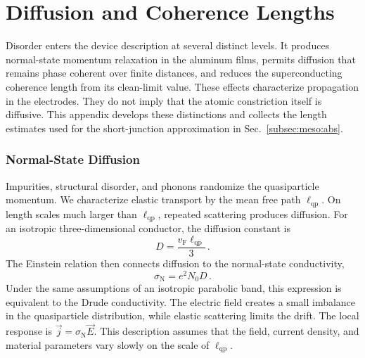 
\chapter{Diffusion and Coherence Lengths}
\label{app:theory:diffusive-transport}

    Disorder enters the device description at several distinct levels. It produces normal-state momentum relaxation in the aluminum films, permits diffusion that remains phase coherent over finite distances, and reduces the superconducting coherence length from its clean-limit value. These effects characterize propagation in the electrodes. They do not imply that the atomic constriction itself is diffusive. This appendix develops these distinctions and collects the length estimates used for the short-junction approximation in Sec.~\ref{subsec:meso:abs}.

    \subsection*{Normal-State Diffusion}

        Impurities, structural disorder, and phonons randomize the quasiparticle momentum. We characterize elastic transport by the mean free path $\ell_\mathrm{qp}$. On length scales much larger than $\ell_\mathrm{qp}$, repeated scattering produces diffusion. For an isotropic three-dimensional conductor, the diffusion constant is
        \begin{equation}
            D = \frac{v_\mathrm{F}\ell_\mathrm{qp}}{3}\,.
        \end{equation}
        The Einstein relation then connects diffusion to the normal-state conductivity,
        \begin{equation}
            \sigma_\mathrm{N} = e^2 N_0 D\,.
        \end{equation}
        Under the same assumptions of an isotropic parabolic band, this expression is equivalent to the Drude conductivity. The electric field creates a small imbalance in the quasiparticle distribution, while elastic scattering limits the drift. The local response is $\vec{j}=\sigma_\mathrm{N}\vec{E}$. This description assumes that the field, current density, and material parameters vary slowly on the scale of $\ell_\mathrm{qp}$. \cite{drude_zur_1900,gross_festkorperphysik_2014}

